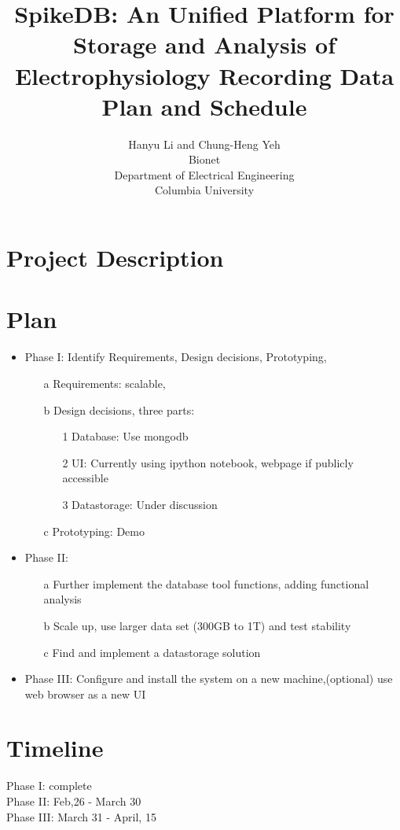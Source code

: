 \documentclass[12pt]{article}
\title{SpikeDB: An Unified Platform for Storage and Analysis of
Electrophysiology Recording Data
\\
{\large Plan and Schedule}
}
\author{Hanyu Li and Chung-Heng Yeh\\
Bionet\\
Department of Electrical Engineering\\
Columbia University
}
\begin{document}
\maketitle


\section{Project Description}
\section{Plan}
\begin{itemize}
\item Phase I: 
Identify Requirements, Design decisions, Prototyping, 
  \begin{itemize}
	\item[a] Requirements: scalable,  
    \item[b] Design decisions, three parts: 
        \begin{itemize}
        \item[1] Database: Use mongodb
        \item[2] UI: Currently using ipython notebook, webpage if publicly accessible 
        \item[3] Datastorage: Under discussion 
        \end{itemize}
        
    \item[c] Prototyping: Demo

  \end{itemize}
\item Phase II:
    \begin{itemize}
    \item[a] Further implement the database tool functions, adding functional analysis
    \item[b] Scale up, use larger data set (300GB to 1T) and test stability
    \item[c] Find and implement a datastorage solution 
    \end{itemize}

\item Phase III: Configure and install the system on a new machine,(optional) use web browser as a new UI
\end{itemize}
\section{Timeline}
    Phase I: complete\\
    Phase II: Feb,26 - March 30\\
    Phase III: March 31 - April, 15 \\
\end{document}
